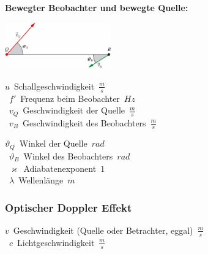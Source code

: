 \begin{center}
	\begin{minipage}{0.3\textwidth}
		\textbf{Bewegter Beobachter und bewegte Quelle:}\\
	\end{minipage}%
	\begin{minipage}{0.2\textwidth}
		\includegraphics[height=2cm,right,keepaspectratio=true]{Images/akustischer_doppler_effekt_bewegter_beobachter_bewegte_quelle.png}
	\end{minipage}
\end{center}

\begin{minipage}{0.25\textwidth}
	\unit{$u$}{Schallgeschwindigkeit}{$\frac{m}{s}$} \\
	\unit{$f'$}{Frequenz beim Beobachter}{$Hz$} \\
	\unit{$v_Q$}{Geschwindigkeit der Quelle}{$\frac{m}{s}$} \\
	\unit{$v_B$}{Geschwindigkeit des Beobachters}{$\frac{m}{s}$}
\end{minipage}%
\begin{minipage}{0.25\textwidth}
	\unit{$\vartheta_Q$}{Winkel der Quelle}{$rad$} \\
	\unit{$\vartheta_B$}{Winkel des Beobachters}{$rad$} \\
	\unit{$\varkappa$}{Adiabatenexponent}{$1$} \\
	\unit{$\lambda$}{Wellenlänge}{$m$}
\end{minipage}






\subsubsection{Optischer Doppler Effekt}

\unit{$v$}{Geschwindigkeit (Quelle oder Betrachter, eggal)}{$\frac{m}{s}$}\\
\unit{$c$}{Lichtgeschwindigkeit}{$\frac{m}{s}$}























